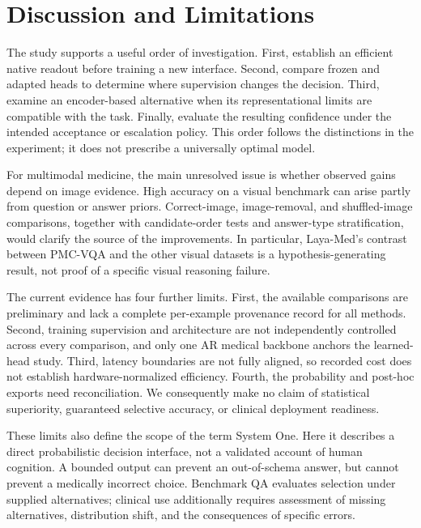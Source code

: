 
\section{Discussion and Limitations}
\label{sec:discussion}

The study supports a useful order of investigation. First, establish an efficient native readout before training a new interface. Second, compare frozen and adapted heads to determine where supervision changes the decision. Third, examine an encoder-based alternative when its representational limits are compatible with the task. Finally, evaluate the resulting confidence under the intended acceptance or escalation policy. This order follows the distinctions in the experiment; it does not prescribe a universally optimal model.

For multimodal medicine, the main unresolved issue is whether observed gains depend on image evidence. High accuracy on a visual benchmark can arise partly from question or answer priors. Correct-image, image-removal, and shuffled-image comparisons, together with candidate-order tests and answer-type stratification, would clarify the source of the improvements. In particular, Laya-Med's contrast between PMC-VQA and the other visual datasets is a hypothesis-generating result, not proof of a specific visual reasoning failure.

The current evidence has four further limits. First, the available comparisons are preliminary and lack a complete per-example provenance record for all methods. Second, training supervision and architecture are not independently controlled across every comparison, and only one AR medical backbone anchors the learned-head study. Third, latency boundaries are not fully aligned, so recorded cost does not establish hardware-normalized efficiency. Fourth, the probability and post-hoc exports need reconciliation. We consequently make no claim of statistical superiority, guaranteed selective accuracy, or clinical deployment readiness.

These limits also define the scope of the term System One. Here it describes a direct probabilistic decision interface, not a validated account of human cognition. A bounded output can prevent an out-of-schema answer, but cannot prevent a medically incorrect choice. Benchmark QA evaluates selection under supplied alternatives; clinical use additionally requires assessment of missing alternatives, distribution shift, and the consequences of specific errors.

